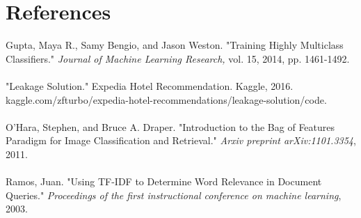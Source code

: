 \documentclass[12pt]{report}
\begin{document}
\chapter*{References}
Gupta, Maya R., Samy Bengio, and Jason Weston. "Training Highly Multiclass Classifiers." \textit{Journal of Machine Learning Research,} vol. 15, 2014, pp. 1461-1492.
\\ \\
"Leakage Solution." Expedia Hotel Recommendation. Kaggle, 2016. kaggle.com/zfturbo/expedia-hotel-recommendations/leakage-solution/code.
\\ \\
O'Hara, Stephen, and Bruce A. Draper. "Introduction to the Bag of Features Paradigm for Image Classification and Retrieval." \textit{Arxiv preprint arXiv:1101.3354}, 2011.
\\ \\
Ramos, Juan. "Using TF-IDF to Determine Word Relevance in Document Queries." \textit{Proceedings of the first instructional conference on machine learning}, 2003.
\end{document}
